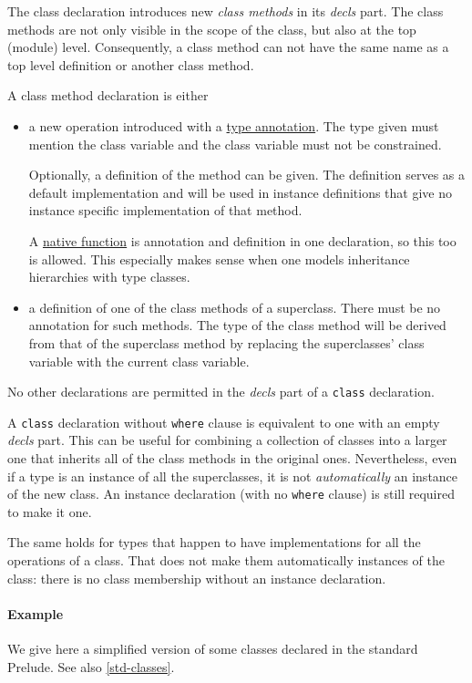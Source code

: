 The class declaration introduces new \emph{class methods} in its \emph{decls} part.
The class methods are not only visible in the scope of the class, but also at the top (module) level.
Consequently, a class method can not have the same name as a top level definition or another class method.

A class method declaration is either

\begin{itemize}
\item a new operation introduced with a \hyperref[annotation]{type annotation}. The type given must mention the class variable and the class variable must not be constrained.

Optionally, a definition of the method can be given. The definition serves as a default implementation and will be used in instance definitions that give no instance specific implementation of that method.

A \hyperref[nativefun]{native function} is annotation and definition in one declaration, so this too is allowed. This especially makes sense when one models \java{} inheritance hierarchies with type classes.

\item a definition of one of the class methods of a superclass. There must be no annotation for such methods. The type of the class method will be derived from that of the superclass method by replacing the superclasses' class variable with the current class variable.
\end{itemize}

No other declarations are permitted in the \emph{decls} part of a \texttt{class} declaration.

A \texttt{class} declaration without \texttt{where} clause is equivalent to one with an empty \emph{decls} part.
This can be useful for combining a collection of classes into a larger one that inherits all of the class methods in the original ones.
Nevertheless, even if a type is an instance of all the superclasses, it is not \emph{automatically} an instance of the new class. An instance declaration (with no \texttt{where} clause) is still required to make it one.

The same holds for types that happen to have implementations for all the operations of  a class. That does not make them automatically instances of the class: there is no class membership without an instance declaration.

\paragraph*{Example} We give here a simplified version of some classes declared in the standard Prelude.
See also \autoref{std-classes}.

